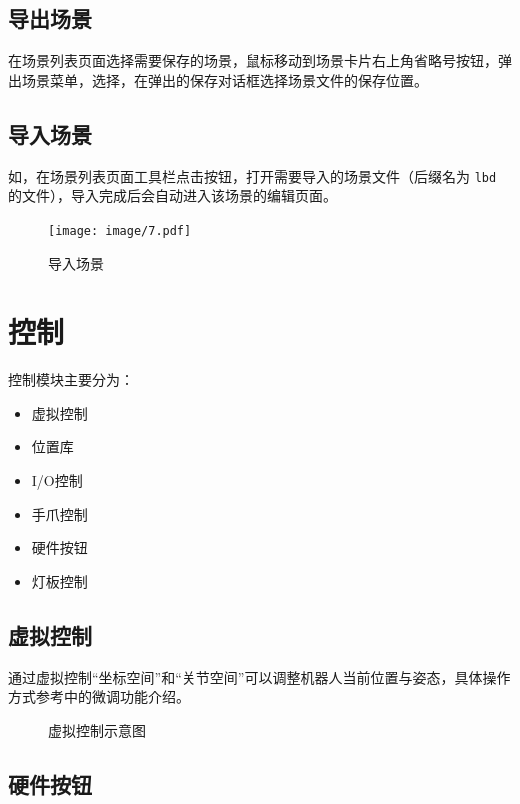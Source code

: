 \subsection{导出场景}
在场景列表页面选择需要保存的场景，鼠标移动到场景卡片右上角省略号按钮，弹出场景菜单，选择，在弹出的保存对话框选择场景文件的保存位置。

\subsection{导入场景}
如，在场景列表页面工具栏点击按钮，打开需要导入的场景文件（后缀名为 \verb|lbd| 的文件），导入完成后会自动进入该场景的编辑页面。

\begin{figure}[ht]
	\centering
	\texttt{[image: image/7.pdf]}
	\caption{导入场景}
	\label{fig:导入场景}
\end{figure}

\section{控制}
控制模块主要分为：
\begin{itemize}
\item 虚拟控制
\item 位置库
\item I/O控制
\item 手爪控制
\item 硬件按钮
\item 灯板控制
\end{itemize}

\subsection{虚拟控制}
通过虚拟控制“坐标空间”和“关节空间”可以调整机器人当前位置与姿态，具体操作方式参考中的微调功能介绍。

\begin{figure}[ht]
	\centering
	\color{red}{缺图}
	\caption{虚拟控制示意图}
	\label{fig:虚拟控制示意图}
\end{figure}

\subsection{硬件按钮}

